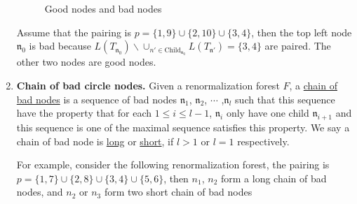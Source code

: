 \begin{defn}
\begin{enumerate}
\begin{figure}[H]
{
            }
            \caption{Good nodes and bad nodes}
            \label{fig.goodbadnodes}
        \end{figure}
        Assume that the pairing is $p=\{1,9\}\cup\{2,10\}\cup\{3,4\}$, then the top left node $\mathfrak{n}_0$ is bad because $L(T_{\mathfrak{n}_0})\backslash\cup_{n'\in \text{Child}_{\mathfrak{n}_0}} L(T_{\mathfrak{n}'})=\{3,4\}$ are paired. The other two nodes are good nodes.

        \item \textbf{Chain of bad circle nodes.} Given a renormalization forest $F$, a \underline{chain of bad nodes} is a sequence of bad nodes $\mathfrak{n}_1$, $\mathfrak{n}_2$, $\cdots$ ,$\mathfrak{n}_{l}$ such that this sequence have the property that for each $1\le i\le l-1$, $\mathfrak{n}_{i}$ only have one child $\mathfrak{n}_{i+1}$ and this sequence is one of the maximal sequence satisfies this property. We say a chain of bad node is \underline{long} or \underline{short}, if $l>1$ or $l=1$ respectively.
        
        For example, consider the following renormalization forest, the pairing is $p=\{1,7\}\cup\{2,8\}\cup\{3,4\}\cup\{5,6\}$, then $n_1$, $n_2$ form a long chain of bad nodes, and $n_2$ or $n_3$ form two short chain of bad nodes

        \begin{figure}[H]
            \centering
            \scalebox{0.36}{
            \begin{tikzpicture}[level distance=80pt, sibling distance=60pt]
                    

\end{tikzpicture}}
\end{figure}
\end{enumerate}
\end{defn}

